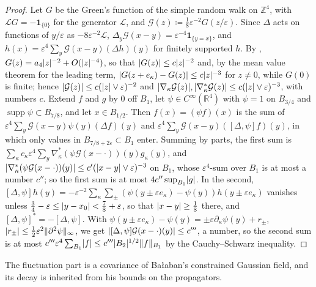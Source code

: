 \documentclass[11pt]{preprint}
\DeclarePairedDelimiter{\abs}{\lvert}{\rvert}
\DeclarePairedDelimiter{\norm}{\lVert}{\rVert}
\numberwithin{equation}{section}
\theoremstyle{definition}
\theoremstyle{remark}
\theoremstyle{plain}
\begin{document}
\begin{proof}
Let $G$ be the Green's function of the simple random walk on $\mathbb Z^4$, with $\mathcal LG = -\mathbf 1_{\{0\}}$ for the generator $\mathcal L$, and $\mathcal G(z) \coloneqq \frac18\varepsilon^{-2}G(z/\varepsilon)$. Since $\Delta$ acts on functions of $y/\varepsilon$ as $-8\varepsilon^{-2}\mathcal L$, $\Delta_y\mathcal G(x - y) = \varepsilon^{-4}\mathbf 1_{\{ y = x \}}$, and $h(x) = \varepsilon^4\sum_y\mathcal G(x - y)(\Delta h)(y)$ for finitely supported $h$. By \cite[Theorem~4.3.1]{LawlerLimic}, $G(z) = a_4\abs z^{-2} + O(\abs z^{-4})$, so that $\abs{G(z)} \leq c\abs z^{-2}$ and, by the mean value theorem for the leading term, $\abs{G(z + e_\kappa) - G(z)} \leq c\abs z^{-3}$ for $z \neq 0$, while $G(0)$ is finite; hence $\abs{\mathcal G(z)} \leq c(\abs z \vee \varepsilon)^{-2}$ and $\abs{\nabla_\kappa\mathcal G(z)}, \abs{\nabla_\kappa^*\mathcal G(z)} \leq c(\abs z \vee \varepsilon)^{-3}$, with numbers $c$. Extend $f$ and $g$ by $0$ off $B_1$, let $\psi \in C^\infty(\mathbb R^4)$ with $\psi = 1$ on $B_{3/4}$ and $\operatorname{supp}\psi \subset B_{7/8}$, and let $x \in B_{1/2}$. Then $f(x) = (\psi f)(x)$ is the sum of $\varepsilon^4\sum_y\mathcal G(x - y)\psi(y)(\Delta f)(y)$ and $\varepsilon^4\sum_y\mathcal G(x - y)([\Delta, \psi]f)(y)$, in which only values in $B_{7/8+2\varepsilon} \subset B_1$ enter. Summing by parts, the first sum is $\sum_\kappa c_\kappa\varepsilon^4\sum_y\nabla_\kappa^*(\psi\mathcal G(x - \cdot))(y)g_\kappa(y)$, and $\abs{\nabla_\kappa^*(\psi\mathcal G(x - \cdot))(y)} \leq c'(\abs{x - y} \vee \varepsilon)^{-3}$ on $B_1$, whose $\varepsilon^4$-sum over $B_1$ is at most a number $c''$; so the first sum is at most $4c''\sup_{B_1}\abs g$. In the second, $[\Delta, \psi]h(y) = -\varepsilon^{-2}\sum_\kappa\sum_\pm(\psi(y \pm \varepsilon e_\kappa) - \psi(y))h(y \pm \varepsilon e_\kappa)$ vanishes unless $\frac34 - \varepsilon \leq \abs{y - x_0} < \frac78 + \varepsilon$, so that $\abs{x - y} \geq \frac18$ there, and $[\Delta, \psi]^* = -[\Delta, \psi]$. With $\psi(y \pm \varepsilon e_\kappa) - \psi(y) = \pm\varepsilon\partial_\kappa\psi(y) + r_\pm$, $\abs{r_\pm} \leq \frac12\varepsilon^2\norm{\partial^2\psi}_\infty$, we get $\abs{[\Delta, \psi]\mathcal G(x - \cdot)(y)} \leq c'''$, a number, so the second sum is at most $c'''\varepsilon^4\sum_{B_1}\abs f \leq c'''\abs{B_2}^{1/2}\norm f_{B_1}$ by the Cauchy--Schwarz inequality.
\end{proof}

The fluctuation part is a covariance of Ba{\l}aban's constrained Gaussian field, and its decay is inherited from his bounds on the propagators.
\end{document}
